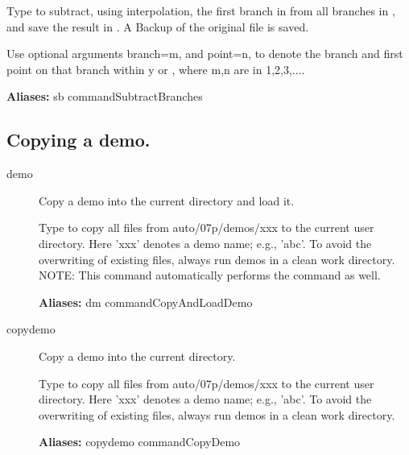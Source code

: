 \documentclass[12pt]{report}
\begin{document}
\begin{description}
    Type  to subtract, using interpolation, the first
    branch in  from all branches in ,
    and save the result in .
    A Backup of the original file is saved.

    Use optional arguments branch=m, and point=n, to denote the branch and
    first point on that branch within y or , where m,n are in
    {1,2,3,...}.

\textbf{Aliases:} sb commandSubtractBranches

\end{description}

\subsection{Copying a demo.}
\label{sec:clui_ref_demo}
\begin{description}
\item[demo]
Copy a demo into the current directory and load it.

    Type  to copy all files from auto/07p/demos/xxx to the
    current user directory.  Here 'xxx' denotes a demo name; e.g.,
    'abc'.  To avoid the overwriting of existing files, always run
    demos in a clean work directory.  NOTE: This command automatically
    performs the  command as well.
    
\textbf{Aliases:} dm commandCopyAndLoadDemo

\item[copydemo]
Copy a demo into the current directory.

    Type  to copy all files from auto/07p/demos/xxx to the
    current user directory.  Here 'xxx' denotes a demo name; e.g.,
    'abc'.  To avoid the overwriting of existing
    files, always run demos in a clean work directory.
    
\textbf{Aliases:} copydemo commandCopyDemo
\end{description}
\end{document}
